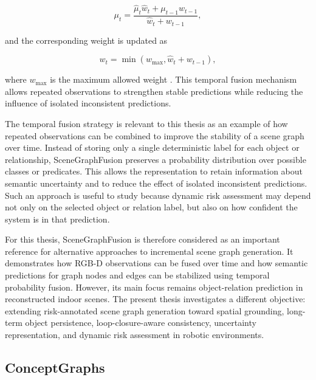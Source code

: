 {\[
\mu_t =
\frac{\hat{\mu}_t \hat{w}_t + \mu_{t-1} w_{t-1}}
{\hat{w}_t + w_{t-1}},
\]

and the corresponding weight is updated as

\[
w_t = \min(w_{\max}, \hat{w}_t + w_{t-1}),
\]

where $w_{\max}$ is the maximum allowed weight \cite{wu2021scenegraphfusion}. This temporal fusion mechanism allows repeated observations to strengthen stable predictions while reducing the influence of isolated inconsistent predictions.

The temporal fusion strategy is relevant to this thesis as an example of how repeated observations can be combined to improve the stability of a scene graph over time. Instead of storing only a single deterministic label for each object or relationship, SceneGraphFusion preserves a probability distribution over possible classes or predicates. This allows the representation to retain information about semantic uncertainty and to reduce the effect of isolated inconsistent predictions. Such an approach is useful to study because dynamic risk assessment may depend not only on the selected object or relation label, but also on how confident the system is in that prediction.

For this thesis, SceneGraphFusion is therefore considered as an important reference for alternative approaches to incremental scene graph generation. It demonstrates how RGB-D observations can be fused over time and how semantic predictions for graph nodes and edges can be stabilized using temporal probability fusion. However, its main focus remains object-relation prediction in reconstructed indoor scenes. The present thesis investigates a different objective: extending risk-annotated scene graph generation toward spatial grounding, long-term object persistence, loop-closure-aware consistency, uncertainty representation, and dynamic risk assessment in robotic environments.

}


\subsection{ConceptGraphs}

